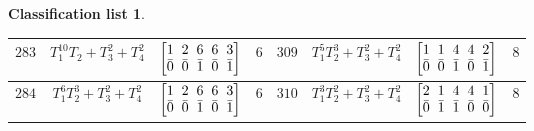 \documentclass[pdftex]{sigma}%
\theoremstyle{definition}
\newtheorem{class-list}[thm]{Classification list}
\numberwithin{equation}{section}
\begin{document}
\begin{class-list}
\begin{table}[h!]
\begin{tabu}{c|c|c|c||c|c|c|c}
\\
\hline
${283}$&${T_{1}^{10}T_{2}+T_{3}^{2}+T_{4}^{2}}$
&$\arraycolsep=1mm\begin{bmatrix}{1} & {2} & {6} & {6} & {3} \\ {\bar{0}} & {\bar{0}} & {\bar{1}} & {\bar{0}} & {\bar{1}}\end{bmatrix}$&${6}$
&${309}$&${T_{1}^{5}T_{2}^{3}+T_{3}^{2}+T_{4}^{2}}$
&$\arraycolsep=1mm\begin{bmatrix}{1} & {1} & {4} & {4} & {2} \\ {\bar{0}} & {\bar{0}} & {\bar{1}} & {\bar{0}} & {\bar{1}}\end{bmatrix}$&${8}$
\\
\hline
${284}$&${T_{1}^{6}T_{2}^{3}+T_{3}^{2}+T_{4}^{2}}$
&$\arraycolsep=1mm\begin{bmatrix}{1} & {2} & {6} & {6} & {3} \\ {\bar{0}} & {\bar{0}} & {\bar{1}} & {\bar{0}} & {\bar{1}}\end{bmatrix}$&${6}$
&${310}$&${T_{1}^{3}T_{2}^{2}+T_{3}^{2}+T_{4}^{2}}$
&$\arraycolsep=1mm\begin{bmatrix}{2} & {1} & {4} & {4} & {1} \\ {\bar{0}} & {\bar{1}} & {\bar{1}} & {\bar{0}} & {\bar{0}}\end{bmatrix}$&${8}$
\\
\hline
\end{tabu}\vspace{-4mm}
\end{table}


\end{class-list}
\end{document}
